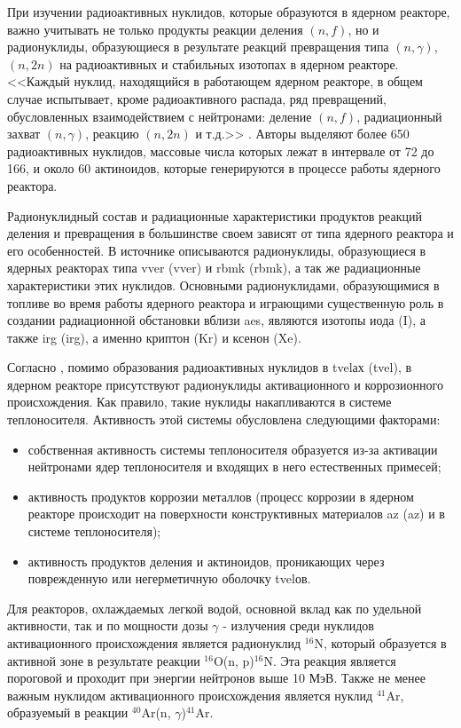 При изучении радиоактивных нуклидов, которые образуются в ядерном реакторе, важно учитывать не только продукты реакции 
деления $(n, f)$, но и радионуклиды, образующиеся в результате реакций превращения типа $(n, \gamma)$, $(n, 2n)$ на 
радиоактивных и стабильных изотопах в ядерном реакторе. <<Каждый нуклид, находящийся в работающем ядерном реакторе, в 
общем случае испытывает, кроме радиоактивного распада, ряд превращений, обусловленных взаимодействием с нейтронами: 
деление $(n, f)$, радиационный захват $(n, \gamma)$, реакцию $(n, 2n)$ и т.д.>> \citep[с.~6]{kolobashkin}.  
Авторы \cite{kolobashkin} выделяют более 650 радиоактивных нуклидов, массовые числа которых лежат в интервале от 72 до 
166, и около 60 актиноидов, которые генерируются в процессе работы ядерного реактора.

Радионуклидный состав и радиационные характеристики продуктов реакций деления и превращения в большинстве своем зависят 
от типа ядерного реактора и его особенностей. В источнике \cite{gusev_bio} описываются радионуклиды, образующиеся в 
ядерных реакторах типа \ac{vver} (\acl{vver}) и \ac{rbmk} (\acl{rbmk}), а так же радиационные характеристики этих 
нуклидов. Основными радионуклидами, образующимися в топливе во время работы ядерного реактора и играющими существенную 
роль в создании радиационной обстановки вблизи \ac{aes}, являются изотопы иода (I), а также \ac{irg} (\acl{irg}), а 
именно криптон (Kr) и ксенон (Xe).

Согласно \cite{gusev_bio, gusev_def, egorov}, помимо образования радиоактивных нуклидов в \ac{tvel}ах (\acl{tvel}), 
в ядерном реакторе присутствуют радионуклиды активационного и коррозионного происхождения. Как правило, такие нуклиды 
накапливаются в системе теплоносителя. Активность этой системы обусловлена следующими факторами:

\begin{itemize}
	\item собственная активность системы теплоносителя образуется из-за активации нейтронами ядер теплоносителя и 
		входящих в него естественных примесей;
	\item активность продуктов коррозии металлов (процесс коррозии в ядерном реакторе происходит на поверхности 
		конструктивных материалов \ac{az} (\acl{az}) и в системе теплоносителя);
	\item активность продуктов деления и актиноидов, проникающих через поврежденную или негерметичную оболочку 
		\ac{tvel}ов.
\end{itemize}
Для реакторов, охлаждаемых легкой водой, основной вклад как по удельной активности, так и по мощности дозы $\gamma$ - 
излучения среди нуклидов активационного происхождения является радионуклид $^{16}\text{N}$, который образуется в
активной зоне в результате реакции $^{16}\text{O}$(n, p)$^{16}\text{N}$. Эта реакция является 
пороговой и проходит при энергии нейтронов выше 10 МэВ. Также не менее важным нуклидом активационного происхождения 
является нуклид $^{41}\text{Ar}$, образуемый в реакции $^{40}\text{Ar}$(n, $\gamma$)$^{41}\text{Ar}$.


